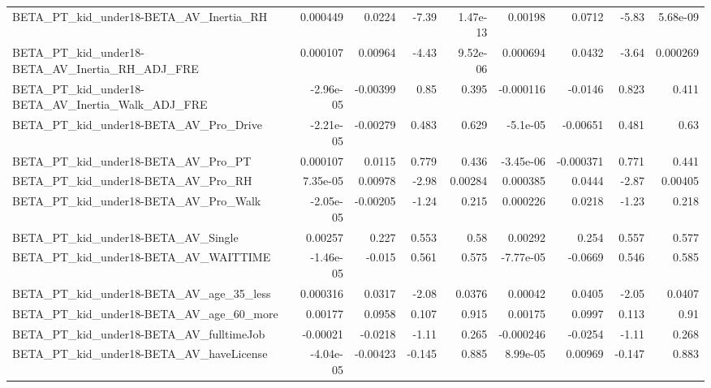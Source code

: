 \begin{tabular}{lrrrrrrrr}
BETA\_PT\_kid\_under18-BETA\_AV\_Inertia\_RH             &    0.000449 &       0.0224 &    -7.39 & 1.47e-13 &    0.00198 &      0.0712 &        -5.83 &      5.68e-09 \\
BETA\_PT\_kid\_under18-BETA\_AV\_Inertia\_RH\_ADJ\_FRE     &    0.000107 &      0.00964 &    -4.43 & 9.52e-06 &   0.000694 &      0.0432 &        -3.64 &      0.000269 \\
BETA\_PT\_kid\_under18-BETA\_AV\_Inertia\_Walk\_ADJ\_FRE   &   -2.96e-05 &     -0.00399 &     0.85 &    0.395 &  -0.000116 &     -0.0146 &        0.823 &         0.411 \\
BETA\_PT\_kid\_under18-BETA\_AV\_Pro\_Drive              &   -2.21e-05 &     -0.00279 &    0.483 &    0.629 &   -5.1e-05 &    -0.00651 &        0.481 &          0.63 \\
BETA\_PT\_kid\_under18-BETA\_AV\_Pro\_PT                 &    0.000107 &       0.0115 &    0.779 &    0.436 &  -3.45e-06 &   -0.000371 &        0.771 &         0.441 \\
BETA\_PT\_kid\_under18-BETA\_AV\_Pro\_RH                 &    7.35e-05 &      0.00978 &    -2.98 &  0.00284 &   0.000385 &      0.0444 &        -2.87 &       0.00405 \\
BETA\_PT\_kid\_under18-BETA\_AV\_Pro\_Walk               &   -2.05e-05 &     -0.00205 &    -1.24 &    0.215 &   0.000226 &      0.0218 &        -1.23 &         0.218 \\
BETA\_PT\_kid\_under18-BETA\_AV\_Single                 &     0.00257 &        0.227 &    0.553 &     0.58 &    0.00292 &       0.254 &        0.557 &         0.577 \\
BETA\_PT\_kid\_under18-BETA\_AV\_WAITTIME               &   -1.46e-05 &       -0.015 &    0.561 &    0.575 &  -7.77e-05 &     -0.0669 &        0.546 &         0.585 \\
BETA\_PT\_kid\_under18-BETA\_AV\_age\_35\_less            &    0.000316 &       0.0317 &    -2.08 &   0.0376 &    0.00042 &      0.0405 &        -2.05 &        0.0407 \\
BETA\_PT\_kid\_under18-BETA\_AV\_age\_60\_more            &     0.00177 &       0.0958 &    0.107 &    0.915 &    0.00175 &      0.0997 &        0.113 &          0.91 \\
BETA\_PT\_kid\_under18-BETA\_AV\_fulltimeJob            &    -0.00021 &      -0.0218 &    -1.11 &    0.265 &  -0.000246 &     -0.0254 &        -1.11 &         0.268 \\
BETA\_PT\_kid\_under18-BETA\_AV\_haveLicense            &   -4.04e-05 &     -0.00423 &   -0.145 &    0.885 &   8.99e-05 &     0.00969 &       -0.147 &         0.883 \\

\end{tabular}
